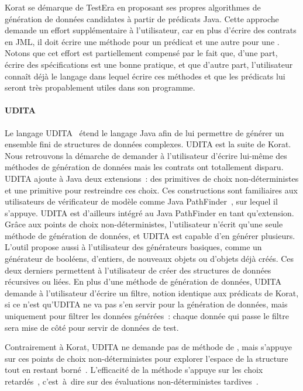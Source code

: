 Korat se démarque de TestEra en proposant ses propres algorithmes de génération
de données candidates à partir de prédicats Java. Cette approche demande un
effort supplémentaire à l'utilisateur, car en plus d'écrire des contrats en JML,
il doit écrire une méthode pour un prédicat et une autre pour une
. Notons que cet effort est partiellement compensé par
le fait que, d'une part, écrire des spécifications est une bonne pratique, et
que d'autre part, l'utilisateur connaît déjà le langage dans lequel écrire ces
méthodes et que les prédicats lui seront très propablement utiles dans son
programme.

\paragraph{UDITA} Le langage UDITA~ étend le langage Java
afin de lui permettre de générer un ensemble fini de structures de données
complexes. UDITA est la suite de Korat. Nous retrouvons la démarche de demander
à l'utilisateur d'écrire lui-même des méthodes de génération de données mais les
contrats ont totallement disparu. UDITA ajoute à Java deux extensions~: des
primitives de choix non-déterministes et une primitive pour restreindre ces
choix. Ces constructions sont familiaires aux utilisateurs de vérificateur de
modèle comme Java PathFinder~, sur lequel il s'appuye. UDITA
est d'ailleurs intégré au  Java PathFinder en tant
qu'extension. Grâce aux points de choix non-déterministes, l'utilisateur n'écrit
qu'une seule méthode de génération de données, et UDITA est capable d'en générer
plusieurs.  L'outil propose aussi à l'utilisateur des générateurs basiques,
comme un générateur de booléens, d'entiers, de nouveaux objets ou d'objets déjà
créés.  Ces deux derniers permettent à l'utilisateur de créer des structures de
données récursives ou liées. En plus d'une méthode de génération de données,
UDITA demande à l'utilisateur d'écrire un filtre, notion identique aux prédicats
de Korat, si ce n'est qu'UDITA ne va pas s'en servir pour la génération de
données, mais uniquement pour filtrer les données générées~: chaque donnée qui
passe le filtre sera mise de côté pour servir de données de test.

Contrairement à Korat, UDITA ne demande pas de méthode de
, mais s'appuye sur ces points de choix
non-déterministes pour explorer l'espace de la structure tout en restant
borné~. L'efficacité de la méthode s'appuye
sur les choix retardés~, c'est~à~dire sur des évaluations
non-déterministes tardives~.

